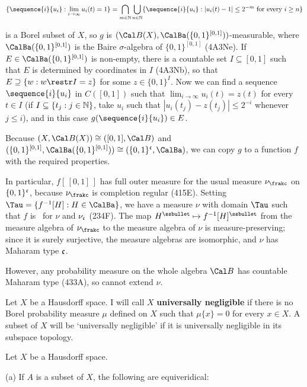 {$$\{\sequence{i}{u_i}:\lim_{i\to\infty}u_i(t)=1\}
=\bigcap_{m\in\Bbb N}\bigcup_{n\in\Bbb N}\{\sequence{i}{u_i}:
|u_i(t)-1|\le 2^{-m}\text{ for every }i\ge n\}$$

\noindent is a Borel subset of $X$, so $g$ is
$(\Cal B(X),\CalBa(\{0,1\}^{[0,1]}))$-measurable, where
$\CalBa(\{0,1\}^{[0,1]})$ is the Baire $\sigma$-algebra of
$\{0,1\}^{[0,1]}$ (4A3Ne).   If $E\in\CalBa(\{0,1\}^{[0,1]})$ is
non-empty, there is a countable set $I\subseteq[0,1]$ such that $E$ is
determined by coordinates in $I$ (4A3Nb), so that
$E\supseteq\{w:w\restr I=z\}$ for some $z\in\{0,1\}^I$.   Now we can
find a sequence $\sequence{i}{u_i}$ in $C([0,1])$ such that
$\lim_{i\to\infty}u_i(t)=z(t)$ for every $t\in I$ (if
$I\subseteq\{t_j:j\in\Bbb N\}$, take $u_i$ such that
$|u_i(t_j)-z(t_j)|\le 2^{-i}$ whenever $j\le i$), and in this case
$g(\sequence{i}{u_i})\in E$.

Because $(X,\Cal B(X))\cong([0,1],\Cal B)$ and
$(\{0,1\}^{[0,1]},\CalBa(\{0,1\}^{[0,1]}))
\cong(\{0,1\}^{\frak c},\CalBa)$, we can copy $g$ to a function $f$ with
the required properties.\ \QeD\

In particular, $f[\,[0,1]\,]$ has full outer measure for the usual measure
$\nu_{\frakc}$ on $\{0,1\}^{\frak c}$,
because $\nu_{\frakc}$ is completion regular (415E).   Setting
$\Tau=\{f^{-1}[H]:H\in\CalBa\}$, we have a measure $\nu$ with domain $\Tau$
such that $f$ is \imp\ for $\nu$ and $\nu_{\frak c}$
(234F).   The map
$H^{\ssbullet}\mapsto f^{-1}[H]^{\ssbullet}$ from the measure algebra of
$\nu_{\frakc}$ to the measure algebra of $\nu$ is measure-preserving;
since
it is surely surjective, the measure algebras are isomorphic, and $\nu$
has Maharam type $\frak c$.

However, any probability measure on the whole algebra $\Cal B$ has
countable Maharam type (433A), so cannot extend $\nu$.
}%


 Let $X$ be a Hausdorff space.   I will call
$X$ {\bf universally negligible} if there is no Borel probability
measure $\mu$ defined on $X$ such that $\mu\{x\}=0$ for every $x\in X$.
A subset of $X$ will be `universally negligible' if it is universally
negligible in its subspace topology.

 Let $X$ be a Hausdorff space.

(a) If $A$ is a subset of $X$, the following are equiveridical:

